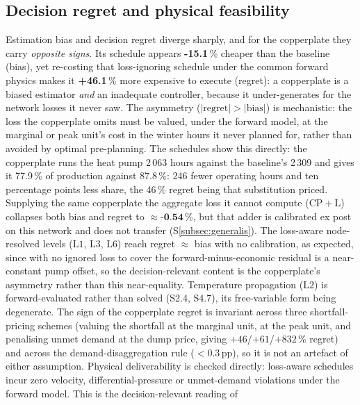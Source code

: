 \documentclass[a4paper,fleqn]{cas-sc}
\newcommand{\CPL}{\ensuremath{\mathrm{CP{+}L}}} %
\newcommand{\Lone}{\ensuremath{\mathrm{L1}}}    %
\newcommand{\Ltwo}{\ensuremath{\mathrm{L2}}}    %
\newcommand{\Lthree}{\ensuremath{\mathrm{L3}}}  %
\newcommand{\Lsix}{\ensuremath{\mathrm{L6}}}    %
\begin{document}
\subsection{Decision regret and physical feasibility}
Estimation bias and decision regret diverge sharply, and for the copperplate they
carry \emph{opposite signs}. Its schedule appears \textbf{-15.1}\,\% cheaper
than the baseline (bias), yet re-costing that loss-ignoring schedule under the common
forward physics makes it \textbf{+46.1}\,\% more expensive to execute
(regret): a copperplate is a biased estimator \emph{and} an inadequate controller,
because it under-generates for the network losses it never saw. The asymmetry
($|\text{regret}|>|\text{bias}|$) is mechanistic: the loss the copperplate omits must
be valued, under the forward model, at the marginal or peak unit's cost in the winter
hours it never planned for, rather than avoided by optimal pre-planning. The schedules show this directly: the copperplate runs the heat pump 2\,063 hours against the baseline's 2\,309 and gives it 77.9\,\% of production against 87.8\,\%: 246 fewer operating hours and ten percentage points less share, the 46\,\% regret being that substitution priced. Supplying the same
copperplate the aggregate loss it cannot compute (\CPL) collapses both bias and regret
to $\approx\textbf{-0.54}\,\%$, but that adder is calibrated ex post on this
network and does not transfer (S\ref{subsec:generalis}). The loss-aware node-resolved levels
(\Lone, \Lthree, \Lsix) reach regret $\approx$ bias with no calibration, as expected, since with
no ignored loss to cover the forward-minus-economic residual is a near-constant pump offset, so
the decision-relevant content is the copperplate's asymmetry rather than this near-equality.
Temperature propagation (\Ltwo) is forward-evaluated rather than solved (S2.4, S4.7), its
free-variable form being degenerate. The sign of the
copperplate regret is invariant across three shortfall-pricing schemes (valuing the shortfall at
the marginal unit, at the peak unit, and penalising unmet demand at the dump price, giving
$+46$/$+61$/$+832$\,\% regret) and across the demand-disaggregation rule
($<0.3$\,pp), so it is not an artefact of either assumption. Physical deliverability is
checked directly: loss-aware schedules incur zero velocity, differential-pressure or
unmet-demand violations under the forward model. This is the decision-relevant reading of
\end{document}

